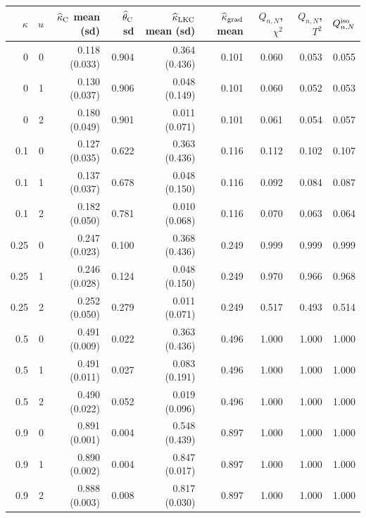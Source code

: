 \begin{tabular}{rrrrrrrrr}
\hline
$\kappa$ & $u$ & $\widehat\kappa_{\rm C}$ mean (sd) & $\widehat\theta_{\rm C}$ sd & $\widehat\kappa_{\rm LKC}$ mean (sd) & $\widehat\kappa_{\rm grad}$ mean & $Q_{n,N}$, $\chi^2$ & $Q_{n,N}$, $T^2$ & $Q^{\rm iso}_{n,N}$ \\
\hline
0 & 0 & 0.118 (0.033) & 0.904 & 0.364 (0.436) & 0.101 & 0.060 & 0.053 & 0.055 \\
0 & 1 & 0.130 (0.037) & 0.906 & 0.048 (0.149) & 0.101 & 0.060 & 0.052 & 0.053 \\
0 & 2 & 0.180 (0.049) & 0.901 & 0.011 (0.071) & 0.101 & 0.061 & 0.054 & 0.057 \\
0.1 & 0 & 0.127 (0.035) & 0.622 & 0.363 (0.436) & 0.116 & 0.112 & 0.102 & 0.107 \\
0.1 & 1 & 0.137 (0.037) & 0.678 & 0.048 (0.150) & 0.116 & 0.092 & 0.084 & 0.087 \\
0.1 & 2 & 0.182 (0.050) & 0.781 & 0.010 (0.068) & 0.116 & 0.070 & 0.063 & 0.064 \\
0.25 & 0 & 0.247 (0.023) & 0.100 & 0.368 (0.436) & 0.249 & 0.999 & 0.999 & 0.999 \\
0.25 & 1 & 0.246 (0.028) & 0.124 & 0.048 (0.150) & 0.249 & 0.970 & 0.966 & 0.968 \\
0.25 & 2 & 0.252 (0.050) & 0.279 & 0.011 (0.071) & 0.249 & 0.517 & 0.493 & 0.514 \\
0.5 & 0 & 0.491 (0.009) & 0.022 & 0.363 (0.436) & 0.496 & 1.000 & 1.000 & 1.000 \\
0.5 & 1 & 0.491 (0.011) & 0.027 & 0.083 (0.191) & 0.496 & 1.000 & 1.000 & 1.000 \\
0.5 & 2 & 0.490 (0.022) & 0.052 & 0.019 (0.096) & 0.496 & 1.000 & 1.000 & 1.000 \\
0.9 & 0 & 0.891 (0.001) & 0.004 & 0.548 (0.439) & 0.897 & 1.000 & 1.000 & 1.000 \\
0.9 & 1 & 0.890 (0.002) & 0.004 & 0.847 (0.017) & 0.897 & 1.000 & 1.000 & 1.000 \\
0.9 & 2 & 0.888 (0.003) & 0.008 & 0.817 (0.030) & 0.897 & 1.000 & 1.000 & 1.000 \\
\hline
\end{tabular}
